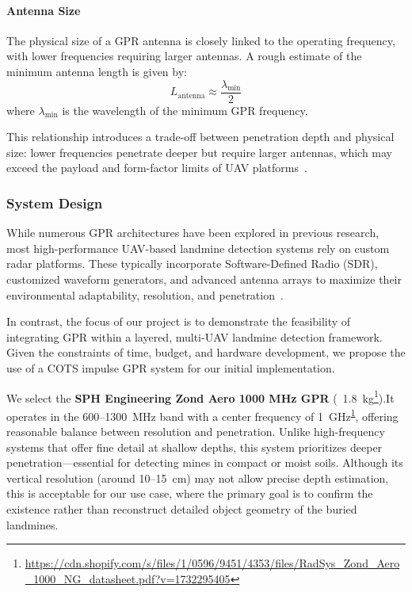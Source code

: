 \paragraph{Antenna Size}

The physical size of a GPR antenna is closely linked to the operating frequency, with lower frequencies requiring larger antennas. A rough estimate of the minimum antenna length is given by:
\[
L_{\text{antenna}} \approx \frac{\lambda_{\text{min}}}{2}
\]
where  $\lambda_{\text{min}}$ is the wavelength of the minimum GPR frequency.

This relationship introduces a trade-off between penetration depth and physical size: lower frequencies penetrate deeper but require larger antennas, which may exceed the payload and form-factor limits of UAV platforms~\cite{alqudsi2021review}.

\subsubsection{System Design}

While numerous GPR architectures have been explored in previous research, most high-performance UAV-based landmine detection systems rely on custom radar platforms. These typically incorporate Software-Defined Radio (SDR), customized waveform generators, and advanced antenna arrays to maximize their environmental adaptability, resolution, and penetration~\cite{cerquera2017uav}.

In contrast, the focus of our project is to demonstrate the feasibility of integrating GPR within a layered, multi-UAV landmine detection framework. Given the constraints of time, budget, and hardware development, we propose the use of a COTS impulse GPR system for our initial implementation.

We select the \textbf{SPH Engineering Zond Aero 1000 MHz GPR} (~1.8~kg\footnote{\label{Zond}\url{https://cdn.shopify.com/s/files/1/0596/9451/4353/files/RadSys_Zond_Aero_1000_NG_datasheet.pdf?v=1732295405}}).It operates in the 600–1300~MHz band with a center frequency of 1~GHz\textsuperscript{\ref{Zond}}, offering reasonable balance between resolution and penetration. Unlike high-frequency systems that offer fine detail at shallow depths, this system prioritizes deeper penetration—essential for detecting mines in compact or moist soils. Although its vertical resolution (around 10--15~cm) may not allow precise depth estimation, this is acceptable for our use case, where the primary goal is to confirm the existence rather than reconstruct detailed object geometry of the buried landmines.

